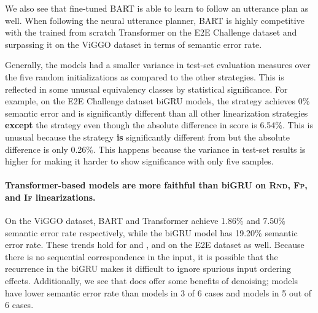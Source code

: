 We also see that fine-tuned BART is able to learn to follow an utterance plan
as well. When following the neural utterance planner, BART is highly
competitive with the trained from scratch Transformer on the E2E Challenge
dataset and surpassing it on the ViGGO dataset in terms of semantic error rate.



Generally, the  models had a smaller variance in test-set
evaluation measures over the five random initializations as compared to the
other strategies. This is reflected in some unusual equivalency classes by
statistical significance. For example, on the E2E Challenge dataset biGRU
models, the  strategy achieves 0\% semantic error and is
significantly different than all other linearization strategies \textbf{except}
the  strategy even though the absolute difference in score is
6.54\%. This is unusual because the  strategy \textbf{is}
significantly different from  but the absolute difference is
only 0.26\%. This happens because the variance in test-set results is higher
for  making it harder to show significance with only five samples.

\paragraph{Transformer-based models are more faithful than biGRU on
\textsc{Rnd, Fp}, and \textsc{If} linearizations.} On the ViGGO dataset, BART
and Transformer  achieve 1.86\% and 7.50\% semantic error rate
respectively, while the biGRU  model has 19.20\% semantic error
rate. These trends hold for  and , and on the E2E
dataset as well. Because there is no sequential correspondence in the input, it
is possible that the recurrence in the biGRU makes it difficult to ignore
spurious input ordering effects.  Additionally, we see that  does
offer some benefits of denoising;  models have lower semantic
error rate than  models in 3 of 6 cases and  models in
5 out of 6 cases.

